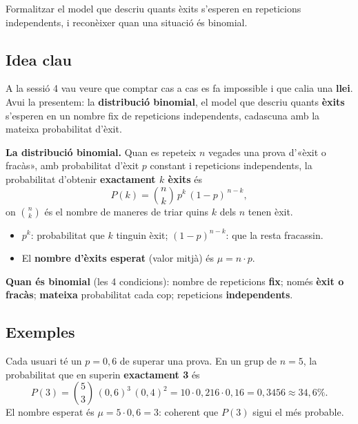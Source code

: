 %
{Formalitzar el model que descriu quants èxits s'esperen en repeticions independents, i reconèixer quan una situació és binomial.}

\subsection{Idea clau}

A la sessió 4 vau veure que comptar cas a cas es fa impossible i que calia una
\textbf{llei}. Avui la presentem: la \textbf{distribució binomial}, el model que descriu
quants \textbf{èxits} s'esperen en un nombre fix de repeticions independents, cadascuna
amb la mateixa probabilitat d'èxit.

\begin{idea}
\textbf{La distribució binomial.} Quan es repeteix $n$ vegades una prova d'«èxit o
fracàs», amb probabilitat d'èxit $p$ constant i repeticions independents, la probabilitat
d'obtenir \textbf{exactament $k$ èxits} és
\[
P(k)=\binom{n}{k}\,p^{k}\,(1-p)^{\,n-k},
\]
on $\binom{n}{k}$ és el nombre de maneres de triar quins $k$ dels $n$ tenen èxit.
\begin{itemize}[leftmargin=1.4em, itemsep=2pt]
  \item $p^{k}$: probabilitat que $k$ tinguin èxit; $(1-p)^{n-k}$: que la resta fracassin.
  \item El \textbf{nombre d'èxits esperat} (valor mitjà) és $\mu=n\cdot p$.
\end{itemize}
\textbf{Quan és binomial} (les 4 condicions): nombre de repeticions \textbf{fix}; només
\textbf{èxit o fracàs}; \textbf{mateixa} probabilitat cada cop; repeticions
\textbf{independents}.
\end{idea}

\subsection{Exemples}

\begin{exemple}
Cada usuari té un $p=0,6$ de superar una prova. En un grup de $n=5$, la probabilitat que
en superin \textbf{exactament 3} és
\[
P(3)=\binom{5}{3}\,(0,6)^{3}\,(0,4)^{2}=10\cdot 0,216\cdot 0,16=0,3456\approx 34,6\%.
\]
El nombre esperat és $\mu=5\cdot 0,6=3$: coherent que $P(3)$ sigui el més probable.
\end{exemple}

